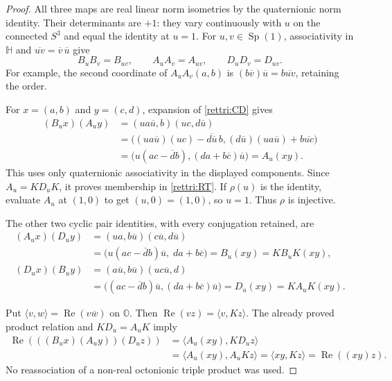 \documentclass[11pt]{article}
\theoremstyle{definition}
\begin{document}
\begin{proof}
All three maps are real linear norm isometries by the quaternionic
norm identity. Their determinants are $+1$: they vary continuously
with $u$ on the connected $S^3$ and equal the identity at $u=1$.
For $u,v\in\operatorname{Sp}(1)$, associativity in $\mathbb H$
and $\overline{uv}=\overline v\,\overline u$ give
\[
 B_uB_v=B_{uv},\qquad A_uA_v=A_{uv},\qquad D_uD_v=D_{uv}.
\]
For example, the second coordinate of $A_uA_v(a,b)$ is
$(b\overline v)\overline u=b\overline{uv}$, retaining the order.

For $x=(a,b)$ and $y=(c,d)$, expansion of
\eqref{rettri:CD} gives
\begin{align*}
 (B_u x)(A_u y)
 &= (u a\overline u,b)(u c,d\overline u)\\
 &=\bigl((u a\overline u)(u c)
          -\overline{d\overline u}\,b,
          (d\overline u)(u a\overline u)
             +b\overline{u c}\bigr)\\
 &=\bigl(u(ac-\overline d b),
                    (da+b\overline c)\overline u\bigr)
 =A_u(xy).
\end{align*}
This uses only quaternionic associativity in the displayed
components. Since $A_u=K D_u K$, it proves membership in
\eqref{rettri:RT}. If $\rho(u)$ is the identity, evaluate
$A_u$ at $(1,0)$ to get $(u,0)=(1,0)$, so $u=1$.
Thus $\rho$ is injective.

The other two cyclic pair identities, with every conjugation
retained, are
\begin{align*}
 (A_u x)(D_u y)
 &=(u a,b\overline u)(c\overline u,d\overline u)\\
 &=\bigl(u(ac-\overline d b)\overline u,\;da+b\overline c\bigr)
 =B_u(xy)=K B_u K(xy),\\
 (D_u x)(B_u y)
 &=(a\overline u,b\overline u)(u c\overline u,d)\\
 &=\bigl((ac-\overline d b)\overline u,
                    (da+b\overline c)\overline u\bigr)
 =D_u(xy)=K A_u K(xy).
\end{align*}

Put $\langle v,w\rangle=\operatorname{Re}(v\overline w)$ on
$\mathbb O$. Then $\operatorname{Re}(vz)=\langle v,Kz\rangle$.
The already proved product relation and $K D_u=A_u K$ imply
\begin{align*}
 \operatorname{Re}(((B_u x)(A_u y))(D_u z))
 &=\langle A_u(xy),K D_u z\rangle\\
 &=\langle A_u(xy),A_u Kz\rangle
 =\langle xy,Kz\rangle
 =\operatorname{Re}((xy)z).
\end{align*}
No reassociation of a non-real octonionic triple product was used.
\end{proof}
\end{document}
